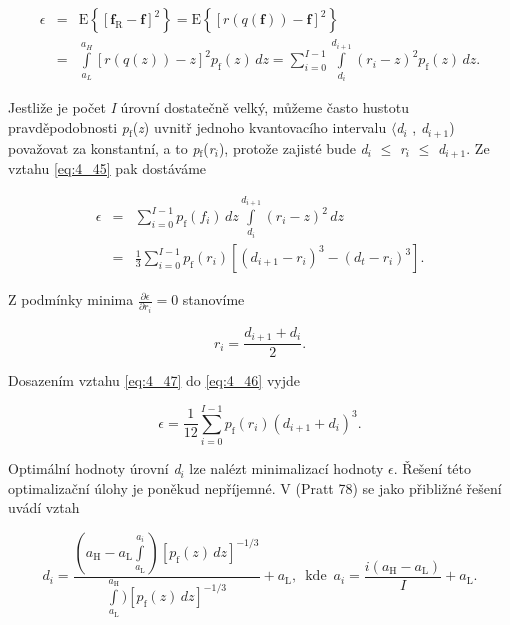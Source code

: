 \begin{eqnarray} \label{eq:4_45}
    \epsilon &=& \mathrm{E} \left\{ \left[ \mathbf{f}_\mathrm{R} - \mathbf{f} \right]^2 \right\} = \mathrm{E} \left\{ \left[ r(q(\mathbf{f} )) - \mathbf{f} \right]^2 \right\} \\
    &=& \int\limits_{a_L}^{a_H} \left[ r(q(z)) - z \right]^2 p_\mathrm{f}(z)\,dz = \sum\limits_{i=0}^{I-1} \int\limits_{d_i}^{d_{i+1}} ( r_i - z)^2 p_\mathrm{f}(z)\,dz. \nonumber
\end{eqnarray}

Jestliže je počet \textit{I} úrovní dostatečně velký, můžeme často hustotu pravděpodobnosti \textit{p}$_\mathrm{f}$(\textit{z}) uvnitř jednoho kvantovacího intervalu $\langle$\textit{d}$_i$ , \textit{d}$_{i+1}$) považovat za konstantní, a to \textit{p}$_\mathrm{f}$(\textit{r}$_i$), protože zajisté bude \textit{d}$_i$ $\leq$ \textit{r}$_i$ $\leq$ \textit{d}$_{i+1}$. Ze vztahu \eqref{eq:4_45} pak dostáváme

\begin{eqnarray} \label{eq:4_46}
    \epsilon &=& \sum\limits_{i=0}^{I-1} p_\mathrm{f}(f_i)\,dz \int\limits_{d_i}^{d_{i+1}} ( r_i - z)^2 \,dz \\
    &=& \frac{1}{3} \sum\limits_{i=0}^{I-1} p_\mathrm{f}(r_i) \left[ (d_{i+1} - r_i )^3 - (d_t - r_i)^3 \right]. \nonumber
\end{eqnarray}

Z podmínky minima $\frac{\partial \epsilon}{\partial r_i} = 0$ stanovíme

\begin{equation} \label{eq:4_47}
    r_i = \frac{d_{i+1} + d_i}{2}.
\end{equation}

Dosazením vztahu \eqref{eq:4_47} do \eqref{eq:4_46} vyjde

\begin{equation} \label{eq:4_48}
    \epsilon = \frac{1}{12} \sum\limits_{i=0}^{I-1} p_\mathrm{f}(r_i)(d_{i+1} + d_i)^3.
\end{equation}

Optimální hodnoty úrovní \textit{d}$_i$ lze nalézt minimalizací hodnoty $\epsilon$. Řešení této optimalizační úlohy je poněkud nepříjemné. V (Pratt 78) se jako přibližné řešení uvádí vztah

\begin{equation} \label{eq:4_49}
    d_i = \frac{(a_\mathrm{H} - a_\mathrm{L} \int\limits_{a_\mathrm{L}}^{a_i}) \left[ p_\mathrm{f}(z)\,dz\right]^{-1/3}}{\int\limits_{a_\mathrm{L}}^{a_\mathrm{H}}) \left[ p_\mathrm{f}(z)\,dz\right]^{-1/3}} + a_\mathrm{L}, \,\,\,\mathrm{kde} \,\,\, a_i = \frac{i(a_\mathrm{H} - a_\mathrm{L})}{I} + a_\mathrm{L}.
\end{equation}

